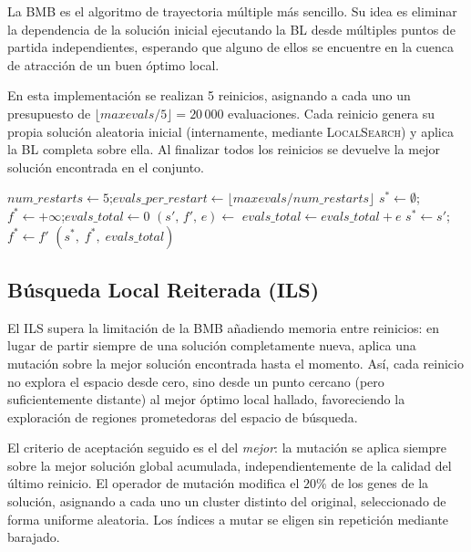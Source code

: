 \documentclass[a4paper,12pt]{article}%
\begin{document}
\noindent La BMB es el algoritmo de trayectoria múltiple más sencillo. Su idea es eliminar la dependencia de la solución inicial ejecutando la BL desde múltiples puntos de partida independientes, esperando que alguno de ellos se encuentre en la cuenca de atracción de un buen óptimo local.

En esta implementación se realizan 5 reinicios, asignando a cada uno un presupuesto de $\lfloor\textit{maxevals}/5\rfloor = 20\,000$ evaluaciones. Cada reinicio genera su propia solución aleatoria inicial (internamente, mediante \textsc{LocalSearch}) y aplica la BL completa sobre ella. Al finalizar todos los reinicios se devuelve la mejor solución encontrada en el conjunto.

\begin{algorithm}[H]
	\begin{algorithmic}
		\State $\textit{num\_restarts} \leftarrow 5$;\quad $\textit{evals\_per\_restart} \leftarrow \lfloor\textit{maxevals}/\textit{num\_restarts}\rfloor$
		\State $s^* \leftarrow \emptyset$;\quad $f^* \leftarrow +\infty$;\quad $\textit{evals\_total} \leftarrow 0$
		\State $(s',\, f',\, e) \leftarrow$ 
		\State $\textit{evals\_total} \leftarrow \textit{evals\_total} + e$
		\quad $s^* \leftarrow s'$;\quad $f^* \leftarrow f'$ \EndIf
		\EndFor
		\State \Return $(s^*,\; f^*,\; \textit{evals\_total})$
		\EndFunction
	\end{algorithmic}
\end{algorithm}


\subsection{Búsqueda Local Reiterada (ILS)}

\noindent El ILS supera la limitación de la BMB añadiendo memoria entre reinicios: en lugar de partir siempre de una solución completamente nueva, aplica una mutación sobre la mejor solución encontrada hasta el momento. Así, cada reinicio no explora el espacio desde cero, sino desde un punto cercano (pero suficientemente distante) al mejor óptimo local hallado, favoreciendo la exploración de regiones prometedoras del espacio de búsqueda.

El criterio de aceptación seguido es el del \textit{mejor}: la mutación se aplica siempre sobre la mejor solución global acumulada, independientemente de la calidad del último reinicio. El operador de mutación modifica el $20\%$ de los genes de la solución, asignando a cada uno un cluster distinto del original, seleccionado de forma uniforme aleatoria. Los índices a mutar se eligen sin repetición mediante barajado.
\end{document}
